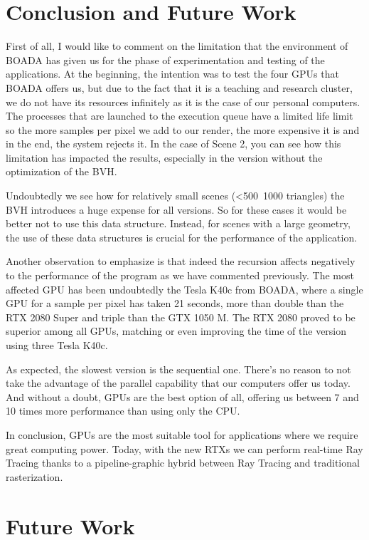 \documentclass[titlepage,12pt]{report}
\begin{document}
\section{Conclusion and Future Work}

First of all, I would like to comment on the limitation that the environment of BOADA has given us for the phase of experimentation and testing of the applications. At the beginning, the intention was to test the four GPUs that BOADA offers us, but due to the fact that it is a teaching and research cluster, we do not have its resources infinitely as it is the case of our personal computers. The processes that are launched to the execution queue have a limited life limit so the more samples per pixel we add to our render, the more expensive it is and in the end, the system rejects it. In the case of Scene 2, you can see how this limitation has impacted the results, especially in the version without the optimization of the BVH.

Undoubtedly we see how for relatively small scenes (<500~1000 triangles) the BVH introduces a huge expense for all versions. So for these cases it would be better not to use this data structure. Instead, for scenes with a large geometry, the use of these data structures is crucial for the performance of the application.

Another observation to emphasize is that indeed the recursion affects negatively to the performance of the program as we have commented previously. The most affected GPU has been undoubtedly the Tesla K40c from BOADA, where a single GPU for a sample per pixel has taken 21 seconds, more than double than the RTX 2080 Super and triple than the GTX 1050 M. The RTX 2080 proved to be superior among all GPUs, matching or even improving the time of the version using three Tesla K40c.

As expected, the slowest version is the sequential one. There's no reason to not take the advantage of the parallel capability that our computers offer us today.  And without a doubt, GPUs are the best option of all, offering us between 7 and 10 times more performance than using only the CPU.

In conclusion, GPUs are the most suitable tool for applications where we require great computing power. Today, with the new RTXs we can perform real-time Ray Tracing thanks to a pipeline-graphic hybrid between Ray Tracing and traditional rasterization.

\section{Future Work}
\end{document}
